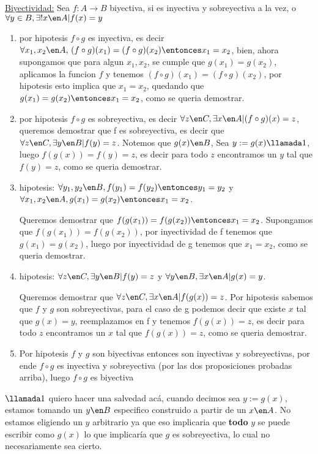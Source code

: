 \underline{Biyectividad:} Sea $f:A \to B$ biyectiva, si es inyectiva y sobreyectiva a la vez, o $\forall y \in B, \exists! x \en A | f(x) = y$
\begin{enumerate}[label=\roman*)]
 \item por hipotesis $f \circ g$ es inyectiva, es decir $\forall x_1, x_2 \en A, \, (f \circ g)(x_1) = (f \circ g)(x_2) \entonces 
 x_1 = x_2$, bien, ahora supongamos que para algun $x_1, x_2$, se cumple que $g(x_1) = g(x_2)$, aplicamos la funcion $f$ y tenemos 
 $(f \circ g)(x_1) = (f \circ g)(x_2)$, por hipotesis esto implica que $x_1 = x_2$, quedando que $g(x_1) = g(x_2) \entonces x_1 = x_2$, como se
 queria demostrar. 
 \item por hipotesis $f \circ g$ es sobreyectiva, es decir $\forall z \en C, \exists x \en A | (f \circ g)(x) = z$, queremos demostrar que f
 es sobreyectiva, es decir que $\forall z \en C, \exists y \en B | f(y) = z$. Notemos que $g(x) \en B$, Sea $y := g(x) \llamada1$, luego $f(g(x)) = f(y) = z$, es decir 
 para todo $z$ encontramos un $y$ tal que $f(y) = z$, como se queria demostrar. 
 \item hipotesis: $\forall y_1, y_2 \en B, f(y_1) = f(y_2) \entonces y_1 = y_2$  y  
 $\forall x_1, x_2 \en A, g(x_1) = g(x_2) \entonces x_1 = x_2$.

 Queremos demostrar que $f(g(x_1)) = f(g(x_2)) \entonces x_1 = x_2$.
 Supongamos que $f(g(x_1)) = f(g(x_2))$, por inyectividad de f tenemos que $g(x_1) = g(x_2)$, luego por inyectividad de g
 tenemos que $x_1 = x_2$, como se queria demostrar. 
 \item hipotesis: $\forall z \en C, \exists y \en B | f(y) = z$  y  
 $\forall y \en B, \exists x \en A | g(x) = y$. 

 Queremos demostrar que $\forall z \en C, \exists x \en A | f(g(x)) = z$.
 Por hipotesis sabemos que $f$ y $g$ son sobreyectivas, para el caso de g podemos decir que existe $x$ tal que $g(x) = y$, reemplazamos en f y tenemos 
 $f(g(x)) = z$, es decir para todo $z$ encontramos un $x$ tal que $f(g(x)) = z$, como se queria demostrar.
 
 \item Por hipotesis $f$ y $g$ son biyectivas entonces son inyectivas y sobreyectivas, por ende $f \circ g$ es inyectiva y sobreyectiva (por las dos proposiciones probadas
 arriba), luego $f \circ g$ es biyectiva
\end{enumerate}

$\llamada1$ quiero hacer una salvedad acá, cuando decimos sea $y := g(x)$, estamos tomando un $y \en B$ especifico construido a partir de un $x \en A$. 
No estamos eligiendo un $y$ arbitrario ya que eso implicaria que \textbf{todo} $y$ se puede escribir como $g(x)$ lo que 
implicaría que $g$ es sobreyectiva, lo cual no necesariamente sea cierto.

\begin{aportes}
 \item {}
\end{aportes}